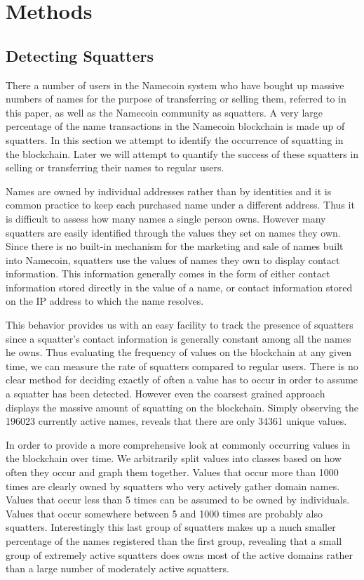 \section{Methods}
\label{sec:methods}

\subsection{Detecting Squatters}
There a number of users in the Namecoin system who have bought up massive numbers of names for the purpose of transferring or selling them, referred to in this paper, as well as the Namecoin community as squatters. A very large percentage of the name transactions in the Namecoin blockchain is made up of squatters. In this section we attempt to identify the occurrence of squatting in the blockchain. Later we will attempt to quantify the success of these squatters in selling or transferring their names to regular users.

Names are owned by individual addresses rather than by identities and it is common practice to keep each purchased name under a different address. Thus it is difficult to assess how many names a single person owns. However many squatters are easily identified through the values they set on names they own. Since there is no built-in mechanism for the marketing and sale of names built into Namecoin, squatters use the values of names they own to display contact information. This information generally comes in the form of either contact information stored directly in the value of a name, or contact information stored on the IP address to which the name resolves.

This behavior provides us with an easy facility to track the presence of squatters since a squatter's contact information is generally constant among all the names he owns. Thus evaluating the frequency of values on the blockchain at any given time, we can measure the rate of squatters compared to regular users.
There is no clear method for deciding exactly of often a value has to occur in order to assume a squatter has been detected. However even the coarsest grained approach displays the massive amount of squatting on the blockchain. Simply observing the 196023 currently active names, reveals that there are only 34361 unique values.

In order to provide a more comprehensive look at commonly occurring values in the blockchain over time. We arbitrarily split values into classes based on how often they occur and graph them together. Values that occur more than 1000 times are clearly owned by squatters who very actively gather domain names. Values that occur less than 5 times can be assumed to be owned by individuals. Values that occur somewhere between 5 and 1000 times are probably also squatters. Interestingly this last group of squatters makes up a much smaller percentage of the names registered than the first group, revealing that a small group of extremely active squatters does owns most of the active domains rather than a large number of moderately active squatters.

